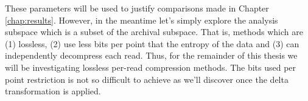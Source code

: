 



These parameters will be used to justify comparisons made in Chapter
\ref{chap:results}. However, in the meantime let's simply explore the analysis
subspace which is a subset of the archival subspace. That is, methods which
are (1) lossless, (2) use less bits per point that the entropy of the data and
(3) can independently decompress each read. Thus, for the remainder of this
thesis we will be investigating lossless per-read compression methods. The bits
used per point restriction is not so difficult to achieve as we'll discover once
the delta transformation is applied.
